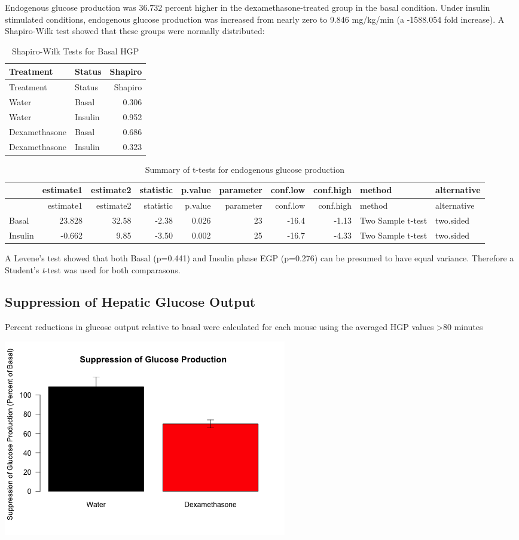 \documentclass[]{article}
\begin{document}
Endogenous glucose production was 36.732 percent higher in the
dexamethasone-treated group in the basal condition. Under insulin
stimulated conditions, endogenous glucose production was increased from
nearly zero to 9.846 mg/kg/min (a -1588.054 fold increase). A
Shapiro-Wilk test showed that these groups were normally distributed:

\begin{longtable}[]{@{}llr@{}}
\caption{Shapiro-Wilk Tests for Basal HGP}\tabularnewline
\toprule
Treatment & Status & Shapiro\tabularnewline
\midrule
\endfirsthead
\toprule
Treatment & Status & Shapiro\tabularnewline
\midrule
\endhead
Water & Basal & 0.306\tabularnewline
Water & Insulin & 0.952\tabularnewline
Dexamethasone & Basal & 0.686\tabularnewline
Dexamethasone & Insulin & 0.323\tabularnewline
\bottomrule
\end{longtable}

\begin{longtable}[]{@{}lrrrrrrrll@{}}
\caption{Summary of t-tests for endogenous glucose
production}\tabularnewline
\toprule
& estimate1 & estimate2 & statistic & p.value & parameter & conf.low &
conf.high & method & alternative\tabularnewline
\midrule
\endfirsthead
\toprule
& estimate1 & estimate2 & statistic & p.value & parameter & conf.low &
conf.high & method & alternative\tabularnewline
\midrule
\endhead
Basal & 23.828 & 32.58 & -2.38 & 0.026 & 23 & -16.4 & -1.13 & Two Sample
t-test & two.sided\tabularnewline
Insulin & -0.662 & 9.85 & -3.50 & 0.002 & 25 & -16.7 & -4.33 & Two
Sample t-test & two.sided\tabularnewline
\bottomrule
\end{longtable}

A Levene's test showed that both Basal (p=0.441) and Insulin phase EGP
(p=0.276) can be presumed to have equal variance. Therefore a Student's
\emph{t}-test was used for both comparasons.

\subsection{Suppression of Hepatic Glucose
Output}\label{suppression-of-hepatic-glucose-output}

Percent reductions in glucose output relative to basal were calculated
for each mouse using the averaged HGP values \textgreater{}80 minutes

\includegraphics{figures/egp-suppression-barplot-hfd-1.png}
\end{document}
